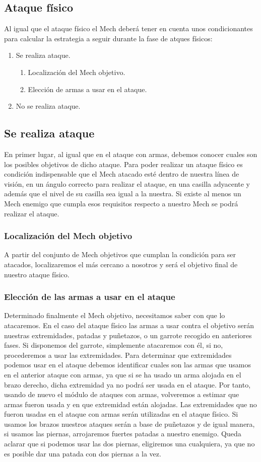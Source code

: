 \documentclass[a4paper,12pt,oneside]{book}
\begin{document}
\subsection*{Ataque físico}
Al igual que el ataque físico el Mech deberá tener en cuenta unos condicionantes para calcular la estrategia a seguir  durante la fase de atques físicos:
\begin{enumerate}
\item Se realiza ataque.
\begin{enumerate}
\item Localización del Mech objetivo.
\item Elección de armas a usar en el ataque.
\end{enumerate}
\item No se realiza ataque.
\end{enumerate}
\subsection*{Se realiza ataque}
En primer lugar, al igual que en el ataque con armas, debemos conocer cuales son los posibles objetivos de dicho ataque. Para poder realizar un ataque físico es condición indispensable que el Mech atacado esté dentro de nuestra línea de visión, en un ángulo correcto para realizar el ataque, en una casilla adyacente y además que el nivel de su casilla sea igual a la nuestra. Si existe al menos un Mech enemigo que cumpla esos requisitos respecto a nuestro Mech se podrá realizar el ataque.
\subsubsection*{Localización del Mech objetivo}
A partir del conjunto de Mech objetivos que cumplan la condición para ser atacados, localizaremos el más cercano a nosotros y será el objetivo final de nuestro ataque físico.
\subsubsection*{Elección de las armas a usar en el ataque}
Determinado finalmente el Mech objetivo, necesitamos saber con que lo atacaremos. En el caso del ataque físico las armas a usar contra el objetivo serán nuestras extremidades, patadas y puñetazos, o un garrote recogido en anteriores fases.
Si disponemos del garrote, simplemente atacaremos con él, si no, procederemos a usar las extremidades. Para determinar que extremidades podemos usar en el ataque debemos  identificar cuales son las armas que usamos en el anterior ataque con armas, ya que si se ha usado un arma alojada en el brazo derecho, dicha extremidad ya no podrá ser usada en el ataque. Por tanto,  usando de nuevo el módulo de ataques con armas,  volveremos  a estimar  que armas fueron usada y en que extremidad  están  alojadas. Las extremidades que no fueron usadas en el ataque con armas serán utilizadas en el ataque físico. Si usamos los brazos nuestros ataques serán a base de puñetazos y de igual manera, si usamos las piernas, arrojaremos fuertes patadas a nuestro enemigo. Queda aclarar que si podemos usar las dos piernas, eligiremos una cualquiera, ya que no es posible dar una patada con dos piernas a la vez.
\end{document}

